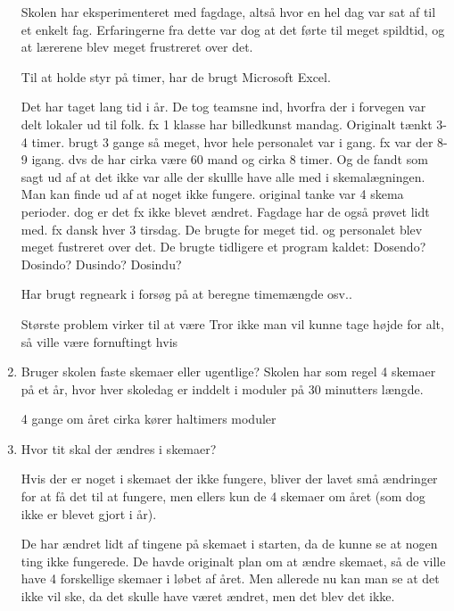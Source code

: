 \begin{enumerate}
	Skolen har eksperimenteret med fagdage, altså hvor en hel dag var sat af til et enkelt fag. Erfaringerne fra dette var dog at det førte til meget spildtid, og at lærerene blev meget frustreret over det.

	Til at holde styr på timer, har de brugt Microsoft Excel.
	\noindent\makebox[\linewidth]{\rule{\paperwidth}{0.4pt}}
	
	Det har taget lang tid i år. De tog teamsne ind, hvorfra der i forvegen var delt lokaler ud til folk. fx 1 klasse har billedkunst mandag. Originalt tænkt 3-4 timer. brugt 3 gange så meget, hvor hele personalet var i gang. fx var der 8-9 igang. dvs de har cirka være 60 mand og cirka 8 timer. Og de fandt som sagt ud af at det ikke var alle der skullle have alle med i skemalægningen. Man kan finde ud af at noget ikke fungere. original tanke var 4 skema perioder. dog er det fx ikke blevet ændret. Fagdage har de også prøvet lidt med. fx dansk hver 3 tirsdag. De brugte for meget tid. og personalet blev meget fustreret over det. De brugte tidligere et program kaldet: Dosendo? Dosindo? Dusindo? Dosindu? 

Har brugt regneark i forsøg på at beregne timemængde osv..

Største problem virker til at være 
Tror ikke man vil kunne tage højde for alt, så ville være fornuftingt hvis %
	\noindent\makebox[\linewidth]{\rule{\paperwidth}{0.4pt}}
	
	\item Bruger skolen faste skemaer eller ugentlige?
	Skolen har som regel 4 skemaer på et år, hvor hver skoledag er inddelt i moduler på 30 minutters længde.

	\noindent\makebox[\linewidth]{\rule{\paperwidth}{0.4pt}}
	4 gange om året cirka
	kører haltimers moduler 
	\noindent\makebox[\linewidth]{\rule{\paperwidth}{0.4pt}}

	\item Hvor tit skal der ændres i skemaer?

	Hvis der er noget i skemaet der ikke fungere, bliver der lavet små ændringer for at få det til at fungere, men ellers kun de 4 skemaer om året (som dog ikke er blevet gjort i år).

	\noindent\makebox[\linewidth]{\rule{\paperwidth}{0.4pt}}
	De har ændret lidt af tingene på skemaet i starten, da de kunne se at nogen ting ikke fungerede. De havde originalt plan om at ændre skemaet, så de ville have 4 forskellige skemaer i løbet af året. Men allerede nu kan man se at det ikke vil ske, da det skulle have været ændret, men det blev det ikke. 
	\noindent\makebox[\linewidth]{\rule{\paperwidth}{0.4pt}}


\end{enumerate}
